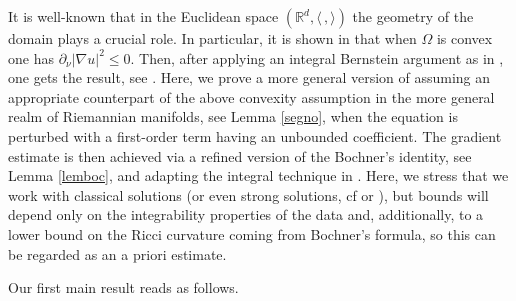 \documentclass[10pt, a4paper, reqno, oneside]{amsart}
\theoremstyle{plain}
\theoremstyle{definition}
\theoremstyle{plain}
\theoremstyle{definition}
\theoremstyle{plain}
\renewcommand{\=}{:=}
\begin{document}
It is well-known that in the Euclidean space $(\mathbb{R}^d,\langle\,,\rangle)$ the geometry of the domain plays a crucial role. In particular, it is shown in \cite[Lemme I.1]{Lio80} that when $\Omega$ is convex one has $\partial_\nu|\nabla u|^2\leq 0$. Then, after applying an integral Bernstein argument as in \cite{Lions85}, one gets the result, see \cite[Theorem 19]{CirantJMPA}. Here, we prove a more general version of \cite{CirantJMPA} assuming an appropriate counterpart of the above convexity assumption in the more general realm of Riemannian manifolds, see Lemma \ref{segno}, when the equation is perturbed with a first-order term having an unbounded coefficient. The gradient estimate is then achieved via a refined version of the Bochner's identity, see Lemma \ref{lemboc}, and adapting the integral technique in \cite{ll,Lions85}. Here, we stress that we work with classical solutions (or even strong solutions, cf \cite[Remark 3]{CGell} or \cite{BardiPerthame}), but bounds will depend only on the integrability properties of the data and, additionally, to a lower bound on the Ricci curvature coming from Bochner's formula, so this can be regarded as an a priori estimate. \smallskip

Our first main result reads as follows.
\end{document}

